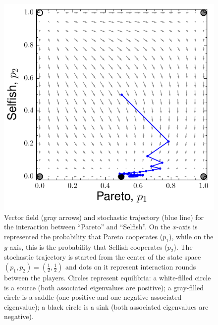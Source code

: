 \documentclass[11pt,reqno]{amsart}
\begin{document}
\begin{figure}
\begin{center}
\includegraphics[scale=0.6]{DSps.pdf}
\caption{Vector field (gray arrows) and stochastic trajectory (blue line) for the interaction between ``Pareto'' and ``Selfish''. On the $x$-axis is represented the probability that Pareto cooperates ($p_1$), while on the $y$-axis, this is the probability that Selfish cooperates ($p_2$). The stochastic trajectory is started from the center of the state space $(p_1,p_2) = (\frac{1}{2},\frac{1}{2})$ and dots on it represent interaction rounds between the players. Circles represent equilibria: a white-filled circle is a source (both associated eigenvalues are positive); a gray-filled circle is a saddle (one positive and one negative associated eigenvalue); a black circle is a sink (both associated eigenvalues are negative).}
\label{cS}
\end{center}
\end{figure}
\end{document}
